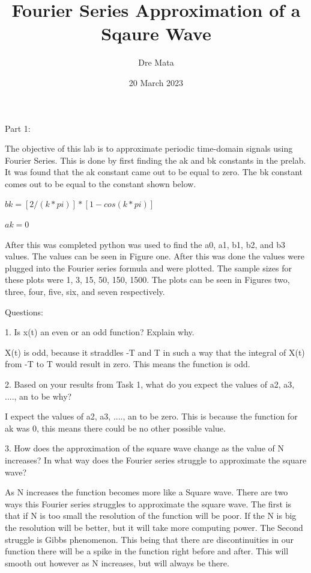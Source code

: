 \documentclass[nobib]{MSword}
\title{Fourier Series Approximation of a Sqaure Wave}
\author{Dre Mata}
\date{20 March 2023}
\begin{document}
\maketitle
\begin{center}
    Part 1:
\end{center}
The objective of this lab is to approximate periodic time-domain signals using Fourier Series. This is done by first finding the ak and bk constants in the prelab. It was found that the ak constant came out to be equal to zero. The bk constant comes out to be equal to the constant shown below.

\begin{center}
    $bk = [2/(k*pi)]*[1 - cos(k*pi)]$
\end{center}

\begin{center}
    $ak = 0$
\end{center}

After this was completed python was used to find the a0, a1, b1, b2, and b3 values. The values can be seen in Figure one. After this was done the values were plugged into the Fourier series formula and were plotted. The sample sizes for these plots were 1, 3, 15, 50, 150, 1500. The plots can be seen in Figures two, three, four, five, six, and seven respectively. 



\begin{center}
    Questions:
\end{center}

1. Is x(t) an even or an odd function? Explain why.

X(t) is odd, because it straddles -T and T in such a way that the integral of X(t) from -T to T would result in zero. This means the function is odd.

2. Based on your results from Task 1, what do you expect the values of a2, a3, ...., an to be why?

I expect the values of a2, a3, ...., an to be zero. This is because the function for ak was 0, this means there could be no other possible value.

3. How does the approximation of the square wave change as the value of N increases? In what way does the Fourier series struggle to approximate the square wave?

As N increases the function becomes more like a Square wave. There are two ways this Fourier series struggles to approximate the square wave. The first is that if N is too small the resolution of the function will be poor. If the N is big the resolution will be better, but it will take more computing power. The Second struggle is Gibbs phenomenon. This being that there are discontinuities in our function there will be a spike in the function right before and after. This will smooth out however as N increases, but will always be there.
\end{document}
